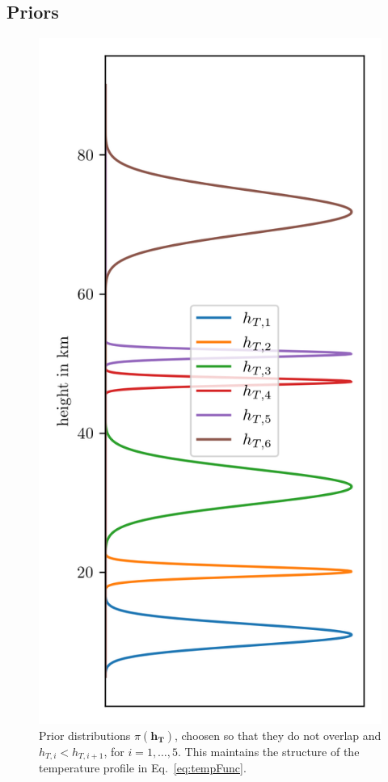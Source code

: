 \subsection{Priors}
\begin{figure}[ht!]
	\centering
	\includegraphics{HeightPriors.png}
	\caption[Prior distributions $\pi(\bm{h_T})$.]{Prior distributions $\pi(\bm{h_T})$, choosen so that they do not overlap and $h_{T,i} < h_{T,i+1}$, for $i = 1, \dots,5$.
	This maintains the structure of the temperature profile in Eq.~\ref{eq:tempFunc}.}
	\label{fig:HeightPriors}
\end{figure} 

